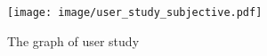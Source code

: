 \begin{figure}[h!]
    \centering
    \texttt{[image: image/user\_study\_subjective.pdf]}
    \caption{The graph of user study}
    \label{fig:sample}
\end{figure}
